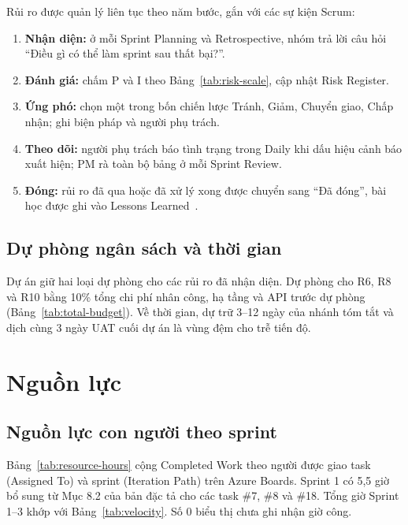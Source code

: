 \documentclass[12pt,a4paper]{report}
\begin{document}
Rủi ro được quản lý liên tục theo năm bước, gắn với các sự kiện Scrum:
\begin{enumerate}
  \item \textbf{Nhận diện:} ở mỗi Sprint Planning và Retrospective, nhóm trả lời câu hỏi ``Điều gì có thể làm
        sprint sau thất bại?''.
  \item \textbf{Đánh giá:} chấm P và I theo Bảng~\ref{tab:risk-scale}, cập nhật Risk Register.
  \item \textbf{Ứng phó:} chọn một trong bốn chiến lược Tránh, Giảm, Chuyển giao, Chấp nhận; ghi biện pháp và
        người phụ trách.
  \item \textbf{Theo dõi:} người phụ trách báo tình trạng trong Daily khi dấu hiệu cảnh báo xuất hiện; PM rà toàn
        bộ bảng ở mỗi Sprint Review.
  \item \textbf{Đóng:} rủi ro đã qua hoặc đã xử lý xong được chuyển sang ``Đã đóng'', bài học được ghi vào Lessons
        Learned~\cite{pcr}.
\end{enumerate}

\section{Dự phòng ngân sách và thời gian}

Dự án giữ hai loại dự phòng cho các rủi ro đã nhận diện. Dự phòng cho R6, R8 và R10 bằng 10\% tổng chi phí
nhân công, hạ tầng và API trước dự phòng (Bảng~\ref{tab:total-budget}). Về thời gian, dự trữ 3--12 ngày của
nhánh tóm tắt và dịch cùng 3 ngày UAT cuối dự án là vùng đệm cho trễ tiến độ.

\chapter{Nguồn lực}
\label{chap:resource}

\section{Nguồn lực con người theo sprint}

Bảng~\ref{tab:resource-hours} cộng Completed Work theo người được giao task (Assigned To) và sprint
(Iteration Path) trên Azure Boards. Sprint 1 có 5,5 giờ bổ sung từ Mục 8.2 của bản đặc tả cho các task \#7, \#8 và \#18.
Tổng giờ Sprint 1--3 khớp với Bảng~\ref{tab:velocity}. Số 0 biểu thị chưa ghi nhận giờ công.
\end{document}
